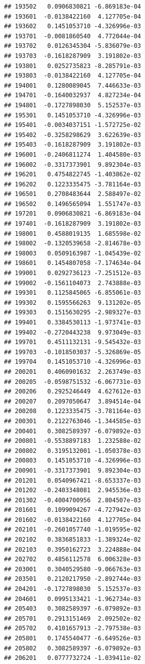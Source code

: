 \documentclass[ignorenonframetext,]{beamer}
\begin{document}
\begin{frame}[fragile]
\begin{verbatim}
## 193502   0.0906830821 -6.869183e-04
## 193601  -0.0138422160  4.127705e-04
## 193602   0.1451053710 -4.326996e-03
## 193701  -0.0081860540  4.772044e-04
## 193702   0.0126345304 -5.836079e-03
## 193703  -0.1618287909  3.191802e-03
## 193801   0.0252735823 -8.285791e-03
## 193803  -0.0138422160  4.127705e-04
## 194001   0.1280089045  7.446633e-03
## 194701  -0.1640032937  4.827234e-04
## 194801  -0.1727898030  5.152537e-03
## 195301   0.1451053710 -4.326996e-03
## 195401  -0.0034037151 -1.572725e-02
## 195402  -0.3258298629  3.622639e-03
## 195403  -0.1618287909  3.191802e-03
## 196001  -0.2406811274  1.404580e-03
## 196002  -0.3317373901  9.892304e-03
## 196201   0.4754822745 -1.403862e-02
## 196202   0.1223335475 -3.781164e-03
## 196501   0.2708483644  2.588497e-02
## 196502   0.1496565094  1.551747e-03
## 197201   0.0906830821 -6.869183e-04
## 197401  -0.1618287909  3.191802e-03
## 198001   0.4588019135  1.685598e-02
## 198002  -0.1320539658 -2.814678e-03
## 198003   0.0509163987 -1.045439e-02
## 198601   0.1454807058 -7.174634e-04
## 199001   0.0292736123 -7.251512e-03
## 199002  -0.1561104073  2.743888e-03
## 199301   0.1125845065 -6.855061e-03
## 199302   0.1595566263  9.131202e-05
## 199303   0.1515630295 -2.989327e-03
## 199401   0.3384530113 -1.973741e-03
## 199402  -0.2720443238  9.973049e-03
## 199701   0.4511132131 -9.545432e-03
## 199703  -0.1018503037 -5.326869e-05
## 199704   0.1451053710 -4.326996e-03
## 200201   0.4060901632  2.263749e-03
## 200205  -0.0598751532 -6.067731e-03
## 200206   0.2925246449  4.627612e-03
## 200207   0.2097050647  3.894514e-04
## 200208   0.1223335475 -3.781164e-03
## 200301   0.2122763046 -1.344585e-03
## 200401   0.3082589397 -6.079892e-03
## 200801  -0.5538897183  1.232588e-02
## 200802   0.3195132001 -1.050378e-03
## 200803   0.1451053710 -4.326996e-03
## 200901  -0.3317373901  9.892304e-03
## 201201   0.0540967421 -8.653337e-03
## 201202  -0.2403348081  2.945536e-03
## 201302  -0.4004700956  2.804507e-03
## 201601   0.1099094267 -4.727942e-03
## 201602  -0.0138422160  4.127705e-04
## 202101  -0.2601057740 -1.019595e-02
## 202102   0.3836851833 -1.389324e-02
## 202103   0.3950162723  3.224888e-04
## 202702   0.4856112578  6.006328e-03
## 203001   0.3040529580 -9.066763e-03
## 203501   0.2120217950 -2.892744e-03
## 204201  -0.1727898030  5.152537e-03
## 204601   0.0995133421 -1.962734e-03
## 205403   0.3082589397 -6.079892e-03
## 205701   0.2913151469  2.092502e-02
## 205702   0.4101657913 -2.797538e-03
## 205801   0.1745540477 -6.649526e-03
## 205802   0.3082589397 -6.079892e-03
## 206201   0.0777732724 -1.039411e-02

\end{verbatim}
\end{frame}
\end{document}

